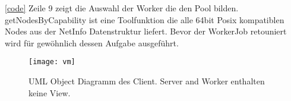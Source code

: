 \ref{code} Zeile 9 zeigt die Auswahl der Worker die den Pool bilden.
getNodesByCapability ist eine Toolfunktion die alle 64bit Posix kompatiblen Nodes aus der NetInfo Datenstruktur liefert. Bevor der WorkerJob retouniert wird für gewöhnlich dessen Aufgabe ausgeführt.

\begin{wrapfigure}{r}{1\textwidth}
  \begin{center}
    \texttt{[image: vm]}
  \end{center}
  \label{deploy}
  \label{viewModel}
  \caption{UML Object Diagramm des Client. Server and Worker enthalten keine View. }
\end{wrapfigure}
